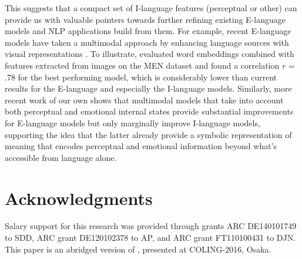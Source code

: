 \documentclass{article}
\begin{document}
This suggests that a compact set of I-language features (perceptual or other) can provide us with valuable pointers towards further refining existing E-language models and NLP applications build from them. For example, recent E-language models have taken a multimodal approach by enhancing language sources with visual representations \cite{Anderson2015,Lazaridou2015}. To illustrate, \cite{BruniBoleda2012} evaluated word embeddings combined with features extracted from images on the MEN dataset and found a correlation $r$ =  .78 for the best performing model, which is considerably lower than current results for the E-language and especially the I-language models. Similarly, more recent work of our own shows that multimodal models that take into account both perceptual and emotional internal states provide substantial improvements for E-language models but only marginally improve I-language models, supporting the idea that the latter already provide a symbolic representation of meaning that encodes perceptual and emotional information beyond what's accessible from language alone.


\section*{Acknowledgments}

\footnotesize{Salary support for this research was provided through grants ARC DE140101749 to SDD, ARC grant DE120102378 to AP, and ARC grant FT110100431 to DJN. This paper is an abridged version of \cite{DeDeyne2016ACL}, presented at COLING-2016, Osaka.}
\clearpage
\pagebreak

%
%
\printbibliography
\end{document}
